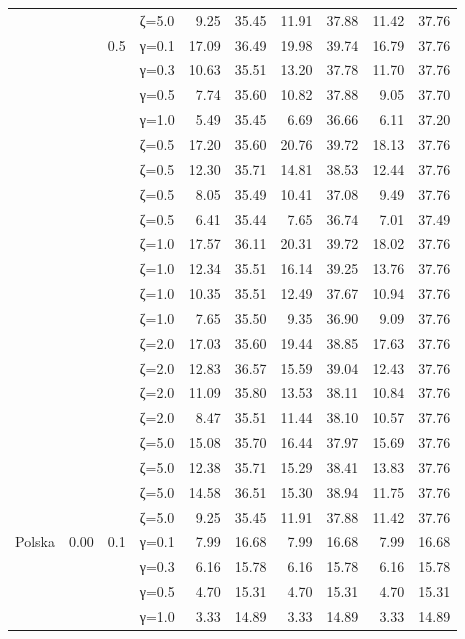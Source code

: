\begin{table}[htbp]
\begin{tabular}{ll r l  rr  rr  rr}
  &  &  & ζ=5.0 & 9.25 & 35.45 & 11.91 & 37.88 & 11.42 & 37.76 \\
  &  & 0.5 & γ=0.1 & 17.09 & 36.49 & 19.98 & 39.74 & 16.79 & 37.76 \\
  &  &  & γ=0.3 & 10.63 & 35.51 & 13.20 & 37.78 & 11.70 & 37.76 \\
  &  &  & γ=0.5 & 7.74 & 35.60 & 10.82 & 37.88 & 9.05 & 37.70 \\
  &  &  & γ=1.0 & 5.49 & 35.45 & 6.69 & 36.66 & 6.11 & 37.20 \\
  &  &  & ζ=0.5 & 17.20 & 35.60 & 20.76 & 39.72 & 18.13 & 37.76 \\
  &  &  & ζ=0.5 & 12.30 & 35.71 & 14.81 & 38.53 & 12.44 & 37.76 \\
  &  &  & ζ=0.5 & 8.05 & 35.49 & 10.41 & 37.08 & 9.49 & 37.76 \\
  &  &  & ζ=0.5 & 6.41 & 35.44 & 7.65 & 36.74 & 7.01 & 37.49 \\
  &  &  & ζ=1.0 & 17.57 & 36.11 & 20.31 & 39.72 & 18.02 & 37.76 \\
  &  &  & ζ=1.0 & 12.34 & 35.51 & 16.14 & 39.25 & 13.76 & 37.76 \\
  &  &  & ζ=1.0 & 10.35 & 35.51 & 12.49 & 37.67 & 10.94 & 37.76 \\
  &  &  & ζ=1.0 & 7.65 & 35.50 & 9.35 & 36.90 & 9.09 & 37.76 \\
  &  &  & ζ=2.0 & 17.03 & 35.60 & 19.44 & 38.85 & 17.63 & 37.76 \\
  &  &  & ζ=2.0 & 12.83 & 36.57 & 15.59 & 39.04 & 12.43 & 37.76 \\
  &  &  & ζ=2.0 & 11.09 & 35.80 & 13.53 & 38.11 & 10.84 & 37.76 \\
  &  &  & ζ=2.0 & 8.47 & 35.51 & 11.44 & 38.10 & 10.57 & 37.76 \\
  &  &  & ζ=5.0 & 15.08 & 35.70 & 16.44 & 37.97 & 15.69 & 37.76 \\
  &  &  & ζ=5.0 & 12.38 & 35.71 & 15.29 & 38.41 & 13.83 & 37.76 \\
  &  &  & ζ=5.0 & 14.58 & 36.51 & 15.30 & 38.94 & 11.75 & 37.76 \\
  &  &  & ζ=5.0 & 9.25 & 35.45 & 11.91 & 37.88 & 11.42 & 37.76 \\
\midrule
 Polska & 0.00 & 0.1 & γ=0.1 & 7.99 & 16.68 & 7.99 & 16.68 & 7.99 & 16.68 \\
  &  &  & γ=0.3 & 6.16 & 15.78 & 6.16 & 15.78 & 6.16 & 15.78 \\
  &  &  & γ=0.5 & 4.70 & 15.31 & 4.70 & 15.31 & 4.70 & 15.31 \\
  &  &  & γ=1.0 & 3.33 & 14.89 & 3.33 & 14.89 & 3.33 & 14.89 \\

\end{tabular}
\end{table}
